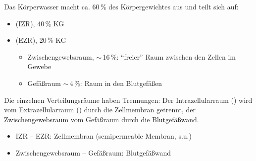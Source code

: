 {

Das Körperwasser macht ca. 60\,\% des Körpergewichtes
aus und teilt sich auf:

\begin{itemize}
  \item {} (IZR), 40\,\% KG
  \item {} (EZR), 20\,\% KG
  \begin{itemize}
    \item {}Zwischengewebsraum,
    $\sim$\,16\,\%: "`freier"'
    Raum zwischen den Zellen im Gewebe
    \item {}Gefäßraum $\sim$\,4\,\%:
    Raum in den Blutgefäßen
  \end{itemize}
\end{itemize}
}{}{}{}{}


{
Die einzelnen Verteilungsräume haben Trennungen: Der Intrazellularraum
() wird vom Extrazellularraum () durch die Zellmembran
getrennt, der Zwischengewebsraum vom Gefäßraum durch die Blutgefäßwand.
}{
\begin{itemize}
    \item IZR -- EZR:    Zellmembran (semipermeable Membran, s.u.)
    \item Zwischengewebsraum -- Gefäßraum:  Blutgefäßwand
\end{itemize}
}{}{}{}


